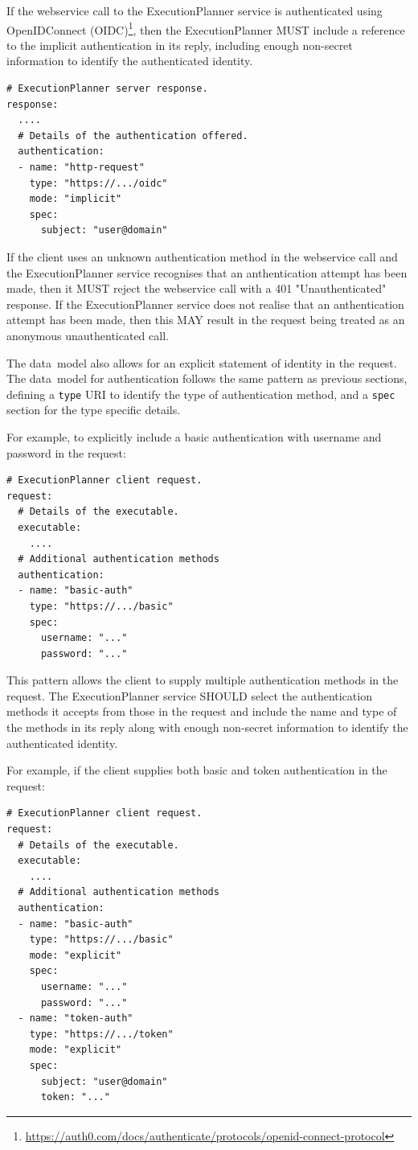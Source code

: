 \documentclass[11pt,a4paper]{ivoa}
\newcommand{\datamodel} {data~model}
\newcommand{\webservice} {webservice}
\newcommand{\execplanner} {ExecutionPlanner}
\newcommand{\codeword}[1] {\texttt{#1}}
\newcommand{\footurl}[1] {\footnote{\url{#1}}}
\begin{document}
If the \webservice{} call to the \execplanner{} service is authenticated
using OpenIDConnect
(OIDC)\footurl{https://auth0.com/docs/authenticate/protocols/openid-connect-protocol},
then the \execplanner{} MUST include a reference to the implicit
authentication in its reply, including enough non-secret
information to identify the authenticated identity.

\begin{lstlisting}[]
# ExecutionPlanner server response.
response:
  ....
  # Details of the authentication offered.
  authentication:
  - name: "http-request"
    type: "https://.../oidc"
    mode: "implicit"
    spec:
      subject: "user@domain"
\end{lstlisting}

If the client uses an unknown authentication method in the \webservice{} call and
the \execplanner{} service recognises that an anthentication attempt has been made,
then it MUST reject the \webservice{} call with a 401 "Unauthenticated" response.
If the \execplanner{} service does not realise that an anthentication attempt has been made,
then this MAY result in the request being treated as an anonymous unauthenticated call.

The \datamodel{} also allows for an explicit statement of identity in the request.
The \datamodel{} for authentication follows the same pattern as previous sections,
defining a \codeword{type} URI to identify the type of authentication method,
and a \codeword{spec} section for the type specific details.

For example, to explicitly include a basic authentication with username and password
in the request:
\begin{lstlisting}[]
# ExecutionPlanner client request.
request:
  # Details of the executable.
  executable:
    ....
  # Additional authentication methods
  authentication:
  - name: "basic-auth"
    type: "https://.../basic"
    spec:
      username: "..."
      password: "..."
\end{lstlisting}

This pattern allows the client to supply multiple authentication methods
in the request. The \execplanner{} service SHOULD select the authentication
methods it accepts from those in the request and include the name and
type of the methods in its reply along with enough non-secret
information to identify the authenticated identity.

For example, if the client supplies both basic and token authentication
in the request:
\begin{lstlisting}[]
# ExecutionPlanner client request.
request:
  # Details of the executable.
  executable:
    ....
  # Additional authentication methods
  authentication:
  - name: "basic-auth"
    type: "https://.../basic"
    mode: "explicit"
    spec:
      username: "..."
      password: "..."
  - name: "token-auth"
    type: "https://.../token"
    mode: "explicit"
    spec:
      subject: "user@domain"
      token: "..."
\end{lstlisting}
\end{document}
